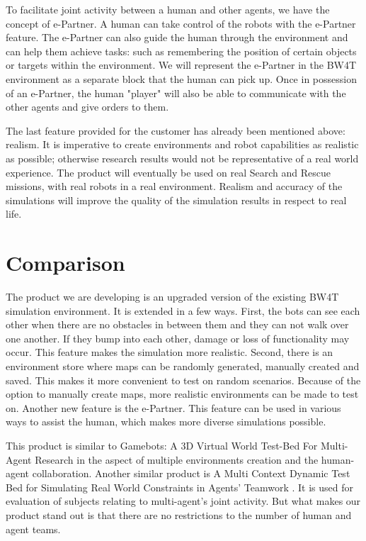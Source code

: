 \documentclass[a4paper]{article}
\begin{document}
To facilitate joint activity between a human and other agents, we have the concept of e-Partner. A human can take control of the robots with the e-Partner feature. The e-Partner can also guide the human through the environment and can help them achieve tasks: such as remembering the position of certain objects or targets within the environment. We will represent the e-Partner in the BW4T environment as a separate block that the human can pick up. Once in possession of an e-Partner, the human "player" will also be able to communicate with the other agents and give orders to them.

The last feature provided for the customer has already been mentioned above: realism. It is imperative to create environments and robot capabilities as realistic as possible; otherwise research results would not be representative of a real world experience. The product will eventually be used on real Search and Rescue missions, with real robots in a real environment. Realism and accuracy of the simulations will improve the quality of the simulation results in respect to real life. 

\section{Comparison}
The product we are developing is an upgraded version of the existing BW4T simulation environment. It is extended in a few ways. First, the bots can see each other when there are no obstacles in between them and they can not walk over one another. If they bump into each other, damage or loss of functionality may occur. This feature makes the simulation more realistic. Second, there is an environment store where maps can be randomly generated, manually created and saved. This makes it more convenient to test on random scenarios. Because of the option to manually create maps, more realistic environments can be made to test on. Another new feature is the e-Partner. This feature can be used in various ways to assist the human, which makes more diverse simulations possible.

This product is similar to Gamebots: A 3D Virtual World Test-Bed For Multi-Agent Research \cite{adobbati2001gamebots} in the aspect of multiple environments creation and the human-agent collaboration. Another similar product is A Multi Context Dynamic Test Bed for Simulating Real World Constraints in Agents' Teamwork \cite{salehi2012multi}. It is used for evaluation of subjects relating to multi-agent's joint activity. But what makes our product stand out is that there are no restrictions to the number of human and agent teams.
\end{document}
